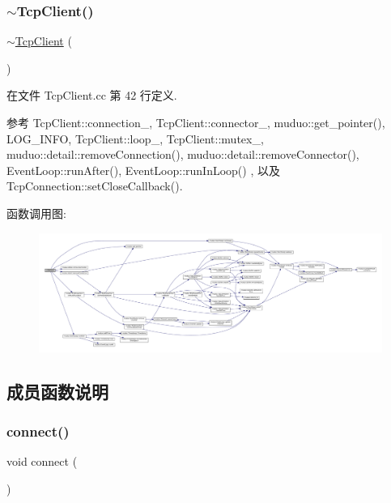 \subsubsection{\texorpdfstring{$\sim$\+Tcp\+Client()}{~TcpClient()}}
{\footnotesize\ttfamily $\sim$\hyperlink{classmuduo_1_1TcpClient}{Tcp\+Client} (\begin{DoxyParamCaption}{ }\end{DoxyParamCaption})}



在文件 Tcp\+Client.\+cc 第 42 行定义.



参考 Tcp\+Client\+::connection\+\_\+, Tcp\+Client\+::connector\+\_\+, muduo\+::get\+\_\+pointer(), L\+O\+G\+\_\+\+I\+N\+FO, Tcp\+Client\+::loop\+\_\+, Tcp\+Client\+::mutex\+\_\+, muduo\+::detail\+::remove\+Connection(), muduo\+::detail\+::remove\+Connector(), Event\+Loop\+::run\+After(), Event\+Loop\+::run\+In\+Loop() , 以及 Tcp\+Connection\+::set\+Close\+Callback().

函数调用图\+:
\nopagebreak
\begin{figure}[H]
\begin{center}
\leavevmode
\includegraphics[width=350pt]{classmuduo_1_1TcpClient_a01845d2886f327b9c8cb5df03cb00d7c_cgraph}
\end{center}
\end{figure}


\subsection{成员函数说明}
\mbox{\label{classmuduo_1_1TcpClient_a1396bf9b5defe9fa844a63b5cd40ac0e}} 
\subsubsection{\texorpdfstring{connect()}{connect()}}
{\footnotesize\ttfamily void connect (\begin{DoxyParamCaption}{ }\end{DoxyParamCaption})}



